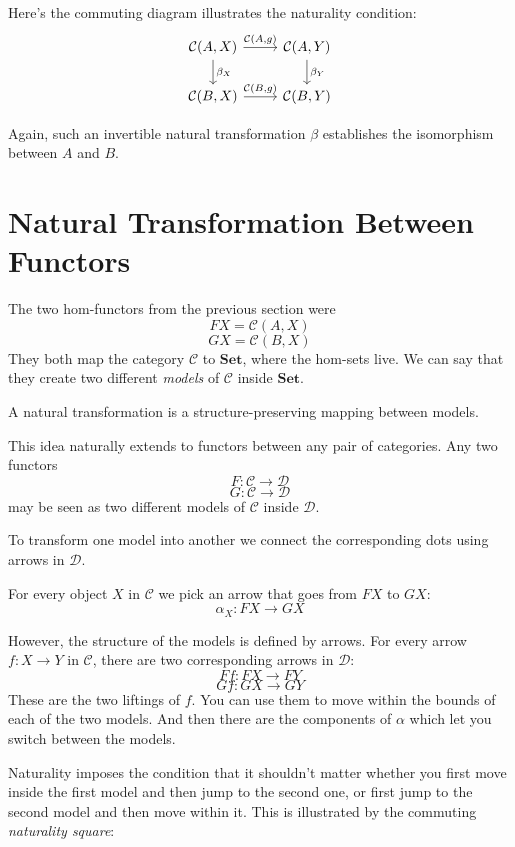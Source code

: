 \documentclass[DaoFP]{subfiles}
\begin{document}
Here's the commuting diagram illustrates the naturality condition:
\[
 \begin{tikzcd}
 \mathcal{C}(A, X)
 \arrow[d, "\beta_X"]
 \arrow[r, "{\mathcal{C}(A, g)}"]
 &
 \mathcal{C}(A, Y)
  \arrow[d, "\beta_Y"]
 \\
 \mathcal{C}(B, X)
 \arrow[r, "{\mathcal{C}(B, g)}"]
& \mathcal{C}(B, Y)
 \end{tikzcd}
\]

Again, such an invertible natural transformation $\beta$ establishes the isomorphism between $A$ and $B$.

\section{Natural Transformation Between Functors}

The two hom-functors from the previous section were
\[ F X =   \mathcal{C}(A, X)\]
\[ G X =   \mathcal{C}(B, X)\]
They both map the category $\mathcal{C}$ to  $\mathbf{Set}$, where the hom-sets live. We can say that they create two different \emph{models} of $\mathcal{C}$ inside $\mathbf{Set}$. 

A natural transformation is a structure-preserving mapping between models. 

This idea naturally extends to functors between any pair of categories. Any two functors
\[ F \colon \mathcal{C} \to \mathcal{D} \]
\[ G \colon \mathcal{C} \to \mathcal{D} \]
may be seen as two different models of $\mathcal{C}$ inside $\mathcal{D}$. 

To transform one model into another we connect the corresponding dots using arrows in $\mathcal{D}$. 

For every object $X$ in $\mathcal{C}$ we pick an arrow that goes from $F X$ to $G X$:
\[ \alpha_X \colon F X \to G X \]

However, the structure of the models is defined by arrows. For every arrow $f \colon X \to Y$ in $\mathcal{C}$, there are two corresponding arrows in $\mathcal{D}$:
\[ F f \colon F X \to F Y\]
\[ G f \colon G X \to G Y \]
These are the two liftings of $f$. You can use them to move within the bounds of each of the two models. And then there are the components of $\alpha$ which let you switch between the models. 

Naturality imposes the condition that it shouldn't matter whether you first move inside the first model and then jump to the second one, or first jump to the second model and then move within it. This is illustrated by the commuting \emph{naturality square}:
\end{document}
